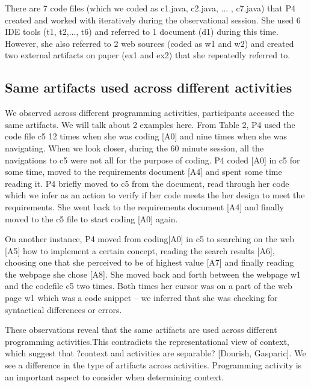 There are 7 code files (which we coded as c1.java, c2.java, ... , c7.java) that P4 created and worked with iteratively during the observational session. She used 6 IDE tools (t1, t2,..., t6) and referred to 1 document (d1) during this time. However, she also referred to 2 web sources (coded as w1 and w2) and created two external artifacts on paper (ex1 and ex2) that she repeatedly referred to.

\subsection{Same artifacts used across different activities}

We observed across different programming activities, participants accessed the same artifacts. We will talk about 2 examples here. From Table 2, P4 used the code file c5 12 times when she was coding [A0] and nine times when she was navigating. When we look closer, during the 60 minute session, all the navigations to c5 were not all for the purpose of coding. P4 coded [A0] in c5 for some time, moved to the requirements document [A4] and spent some time reading it. P4 briefly moved to c5 from the document, read through her code which we infer as an action to verify if her code meets the her design to meet the requirements. She went back to the requirements document [A4] and finally moved to the c5 file to start coding [A0] again.

On another instance, P4 moved from coding[A0] in c5 to searching on the web [A5] how to implement a certain concept, reading the search results [A6], choosing one that she perceived to be of highest value [A7] and finally reading the webpage she chose [A8]. She moved back and forth between the webpage w1 and the codefile c5 two times. Both times her cursor was on a part of the web page w1 which was a code snippet -- we inferred that she was checking for syntactical differences or errors. 

These observations reveal that the same artifacts are used across different programming activities.This contradicts the representational view of context, which suggest that ?context and activities are separable? [Dourish, Gasparic]. We see a difference in the type of artifacts across activities. Programming activity is an important aspect to consider when determining context. 


